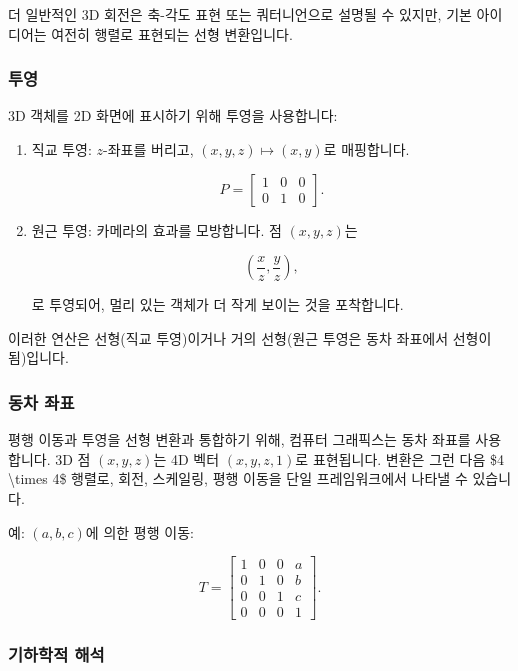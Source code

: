 \documentclass[
  12pt,
  a4paper,
]{article}
\begin{document}
더 일반적인 3D 회전은 축-각도 표현 또는 쿼터니언으로 설명될 수 있지만, 기본 아이디어는 여전히 행렬로 표현되는 선형 변환입니다.

\subsubsection{투영}\label{projections-2}

3D 객체를 2D 화면에 표시하기 위해 투영을 사용합니다:

\begin{enumerate}
\def\labelenumi{\arabic{enumi}.}
\item
  직교 투영: \(z\)-좌표를 버리고, \((x,y,z) \mapsto (x,y)\)로 매핑합니다.

  \[P = \begin{bmatrix}
  1 & 0 & 0 \\
  0 & 1 & 0
  \end{bmatrix}.\]
\item
  원근 투영: 카메라의 효과를 모방합니다. 점 \((x,y,z)\)는

  \[\left(\frac{x}{z}, \frac{y}{z}\right),\]

  로 투영되어, 멀리 있는 객체가 더 작게 보이는 것을 포착합니다.
\end{enumerate}

이러한 연산은 선형(직교 투영)이거나 거의 선형(원근 투영은 동차 좌표에서 선형이 됨)입니다.

\subsubsection{동차 좌표}\label{homogeneous-coordinates}

평행 이동과 투영을 선형 변환과 통합하기 위해, 컴퓨터 그래픽스는 동차 좌표를 사용합니다. 3D 점 \((x,y,z)\)는 4D 벡터 \((x,y,z,1)\)로 표현됩니다. 변환은 그런 다음 \$4 \textbackslash times 4\$ 행렬로, 회전, 스케일링, 평행 이동을 단일 프레임워크에서 나타낼 수 있습니다.

예: \((a,b,c)\)에 의한 평행 이동:

\[T = \begin{bmatrix}
1 & 0 & 0 & a \\
0 & 1 & 0 & b \\
0 & 0 & 1 & c \\
0 & 0 & 0 & 1
\end{bmatrix}.\]

\subsubsection{기하학적 해석}\label{geometric-interpretation-23}
\end{document}
